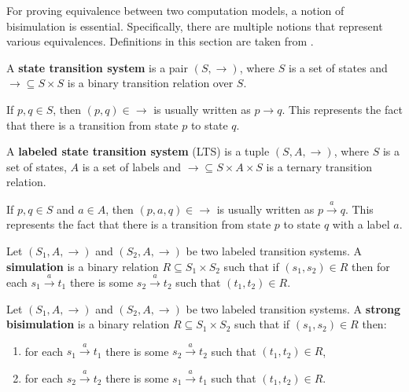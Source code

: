 For proving equivalence between two computation models, a notion of  bisimulation is essential. Specifically, there are multiple notions that represent various equivalences. Definitions in this section are taken from \cite{DeNicola95Bisimulations}.
\begin{definition}
  A  {\bf state transition system} is a pair $(S, \rightarrow)$, where $S$ is a set of states and $\rightarrow\subseteq S\times S$ is a binary transition relation over $S$.
\end{definition}
  If $p,q\in S$, then $(p,q)\in \rightarrow$ is usually written as $p\rightarrow q$. This represents the fact that there is a transition from state $p$ to state $q$.

\begin{definition}
  A  {\bf labeled state transition system} (LTS) is a tuple $(S, A, \rightarrow)$, where $S$ is a set of states, $A$ is a set of labels and $\rightarrow\subseteq S\times A\times S$ is a ternary transition relation.
\end{definition}

If $p,q\in S$ and $a\in A$, then $(p,a,q)\in \rightarrow$ is usually written as $p\xrightarrow{a} q$. This represents the fact that there is a transition from state $p$ to state $q$ with a label $a$.

\begin{definition}
  Let $(S_1, A, \rightarrow)$ and $(S_2, A, \rightarrow)$ be two labeled transition systems.
  A  {\bf simulation} is a binary relation $R\subseteq S_1\times S_2$ such that if $(s_1,s_2)\in R$ then for each $s_1\xrightarrow{a} t_1$ there is some $s_2\xrightarrow{a} t_2$ such that $(t_1, t_2)\in R$.
\end{definition}

\begin{definition}
  Let $(S_1, A, \rightarrow)$ and $(S_2, A, \rightarrow)$ be two labeled transition systems.
  A  {\bf strong bisimulation} is a binary relation $R\subseteq S_1\times S_2$ such that if $(s_1,s_2)\in R$ then:
  \begin{enumerate}
    \item for each $s_1\xrightarrow{a} t_1$ there is some $s_2\xrightarrow{a} t_2$ such that $(t_1, t_2)\in R$,
    \item for each $s_2\xrightarrow{a} t_2$ there is some $s_1\xrightarrow{a} t_1$ such that $(t_1, t_2)\in R$.
  \end{enumerate}
\end{definition}

